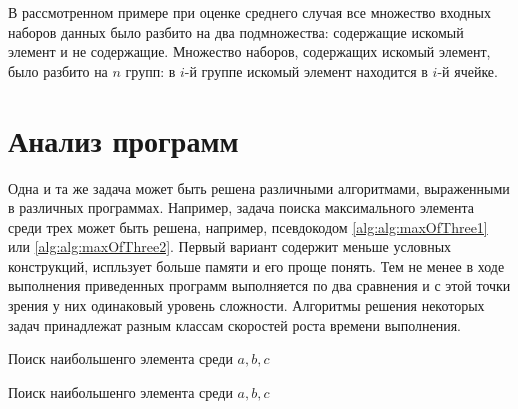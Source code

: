 В рассмотренном примере при оценке среднего случая все множество входных наборов данных было разбито на два подмножества: содержащие искомый элемент и не содержащие. Множество наборов, содержащих искомый элемент, было разбито на $n$ групп: в $i$-й группе искомый элемент находится в $i$-й ячейке.


\section{Анализ программ}

Одна и та же задача может быть решена различными алгоритмами, выраженными в различных программах. Например, задача поиска максимального элемента среди трех может быть решена, например, псевдокодом \ref{alg:alg:maxOfThree1} или \ref{alg:alg:maxOfThree2}. Первый вариант содержит меньше условных конструкций, испльзует больше памяти и его проще понять. Тем не менее в ходе выполнения приведенных программ выполняется по два сравнения и с этой точки зрения у них одинаковый уровень сложности. Алгоритмы решения некоторых задач принадлежат разным классам скоростей роста времени выполнения.

\begin{algorithm}
    \caption{Поиск наибольшенго элемента среди $a,b,c$}
    \label{alg:alg:maxOfThree1}
    \begin{algorithmic}[1]

        \ENDIF
        \ENDIF
    \end{algorithmic}
\end{algorithm}
\begin{algorithm}
    \caption{Поиск наибольшенго элемента среди $a,b,c$}
    \label{alg:alg:maxOfThree2}
    \begin{algorithmic}[1]

            \ELSE
            \ENDIF
        \ELSE[$b\geq a$]
            \ELSE
            \ENDIF            
        \ENDIF
    \end{algorithmic}
\end{algorithm}

